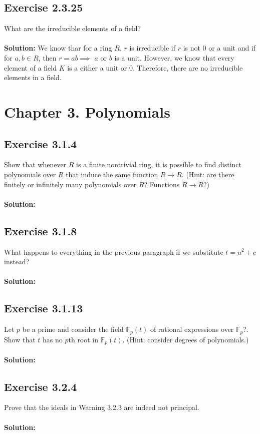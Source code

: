 \documentclass{article}
\begin{document}
\subsection*{Exercise 2.3.25}
What are the irreducible elements of a field?
\\\\
\textbf{Solution:}
We know thar for a ring $R$, $r$ is irreducible if $r$ is not 0 or a unit and if for $a,b \in R$, 
then $r = ab \implies$ $a$ or $b$ is a unit.
However, we know that every element of a field $K$ is a either a unit or 0. Therefore, there are no
irreducible elements in a field.

\section*{Chapter 3. Polynomials}

\subsection*{Exercise 3.1.4}
Show that whenever $R$ is a finite nontrivial ring, it is
possible to find distinct polynomials over $R$ that induce the same function
$R \rightarrow R$. (Hint: are there finitely or infinitely many polynomials
over $R$? Functions $R \rightarrow R$?)
\\\\
\textbf{Solution:}

\subsection*{Exercise 3.1.8}
What happens to everything in the previous paragraph
if we substitute $t=u^2+c$ instead?
\\\\
\textbf{Solution:}

\subsection*{Exercise 3.1.13}
Let $p$ be a prime and consider the field $\mathbb{F}_p(t)$ of
rational expressions over $\mathbb{F}_p$?. Show that $t$ has no $p$th root in $\mathbb{F}_p(t)$.
(Hint: consider degrees of polynomials.)
\\\\
\textbf{Solution:}

\subsection*{Exercise 3.2.4}
Prove that the ideals in Warning 3.2.3 are indeed not
principal.
\\\\
\textbf{Solution:}
\end{document}
